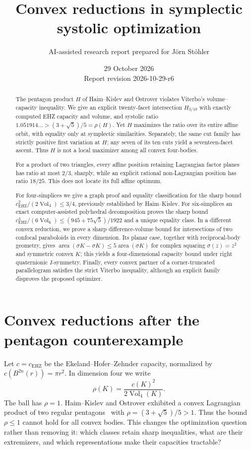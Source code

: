 \documentclass[a4paper,11pt]{article}
\title{Convex reductions in symplectic systolic optimization}
\author{AI-assisted research report prepared for Jörn Stöhler}
\date{29 October 2026\\Report revision 2026-10-29-r6}
\theoremstyle{definition}
\theoremstyle{remark}
\newcommand{\area}{\operatorname{area}}
\newcommand{\Vol}{\operatorname{Vol}}
\newcommand{\EHZ}{\mathrm{EHZ}}
\begin{document}
\maketitle
\begin{abstract}
The pentagon product $H$ of Haim--Kislev and Ostrover violates Viterbo's
volume--capacity inequality. We give an explicit twenty-facet intersection
$H_{3/10}$ with exactly computed EHZ capacity and volume, and systolic ratio
$1.051914\ldots>(3+\sqrt5)/5=\rho(H)$. Yet $H$ maximizes the ratio over its
entire affine orbit, with equality only at symplectic similarities. Separately,
the same cut family has strictly positive first variation at $H$; any seven
of its ten cuts yield a seventeen-facet ascent. Thus $H$ is not a local
maximizer among all convex four-bodies.

For a product of two triangles, every affine position retaining Lagrangian
factor planes has ratio at most $2/3$, sharply, while an explicit rational
non-Lagrangian position has ratio $18/25$. This does not locate its full
affine optimum.

For four-simplices we give a graph proof and equality classification for the
sharp bound $c_{\EHZ}^2/(2\Vol_4)\leq3/4$, previously established by
Haim--Kislev. For six-simplices an exact computer-assisted polyhedral
decomposition proves the sharp bound
$c_{\EHZ}^3/(6\Vol_6)\leq(945+75\sqrt5)/1922$ and a unique equality class.
In a different convex reduction, we prove a sharp difference-volume bound for
intersections of two confocal paraboloids in every dimension. Its planar case,
together with reciprocal-body geometry, gives
$\area(\sigma K-\sigma K)\leq5\area(\sigma K)$ for complex squaring
$\sigma(z)=z^2$ and symmetric convex $K$; this yields a four-dimensional
capacity bound under right quaternionic $I$-symmetry. Finally, every convex
partner of a corner-truncated parallelogram satisfies the strict Viterbo
inequality, although an explicit family disproves the proposed optimizer.
\end{abstract}
\tableofcontents

\section{Convex reductions after the pentagon counterexample}

Let $c=c_{\EHZ}$ be the Ekeland--Hofer--Zehnder capacity, normalized by
$c(B^{2n}(r))=\pi r^2$. In dimension four we write
\[
 \rho(K)=\frac{c(K)^2}{2\Vol_4(K)}.
\]
The ball has $\rho=1$. Haim--Kislev and Ostrover exhibited a convex
Lagrangian product of two regular pentagons~\cite{HKO2026} with
$\rho=(3+\sqrt5)/5>1$. Thus the bound $\rho\leq1$ cannot hold for
all convex bodies. This changes the optimization question rather than
removing it: which classes retain sharp inequalities, what are their
extremizers, and which representations make their capacities tractable?
\end{document}
